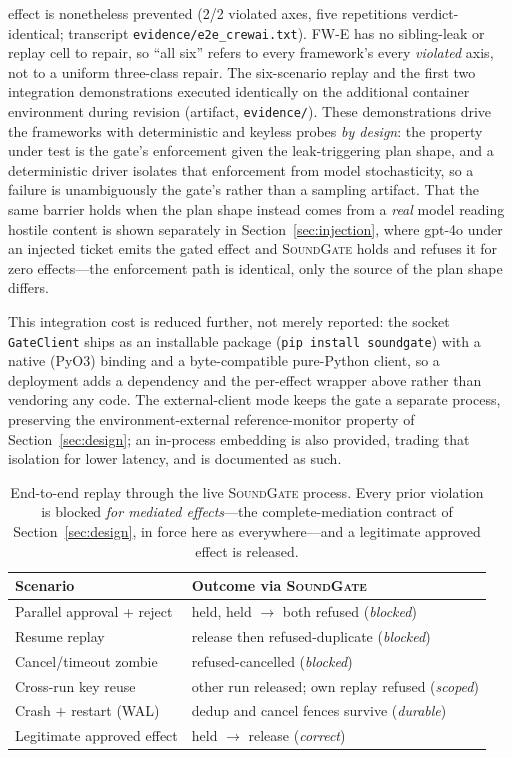 \documentclass[10pt,journal,compsoc]{IEEEtran}
\newcommand{\sys}{\textsc{SoundGate}}
\begin{document}
effect is nonetheless prevented (2/2 violated axes, five repetitions
verdict-identical; transcript \texttt{evidence/e2e\_crewai.txt}).
\textsf{FW-E} has no sibling-leak or
replay cell to repair, so ``all six'' refers to every framework's every
\emph{violated} axis, not to a uniform three-class repair. The six-scenario replay and the first two
integration demonstrations executed identically on the additional container
environment during revision (artifact, \texttt{evidence/}). These
demonstrations drive the frameworks with deterministic and keyless probes
\emph{by design}: the property under test is the gate's enforcement given the
leak-triggering plan shape, and a deterministic driver isolates that
enforcement from model stochasticity, so a failure is unambiguously the
gate's rather than a sampling artifact. That the same barrier holds when the
plan shape instead comes from a \emph{real} model reading hostile content is
shown separately in Section~\ref{sec:injection}, where \textsf{gpt-4o} under
an injected ticket emits the gated effect and \sys{} holds and refuses it for
zero effects---the enforcement path is identical, only the source of the plan
shape differs.

\noindent This integration cost is reduced further, not merely reported: the
socket \texttt{GateClient} ships as an installable package
(\texttt{pip install soundgate}) with a native (PyO3) binding and a
byte-compatible pure-Python client, so a deployment adds a dependency and the
per-effect wrapper above rather than vendoring any code. The external-client
mode keeps the gate a separate process, preserving the environment-external
reference-monitor property of Section~\ref{sec:design}; an in-process embedding
is also provided, trading that isolation for lower latency, and is documented as
such.

\begin{table}[!t]
\centering
\caption{End-to-end replay through the live \sys{} process. Every prior
violation is blocked \emph{for mediated effects}---the complete-mediation
contract of Section~\ref{sec:design}, in force here as everywhere---and a
legitimate approved effect is released.}
\label{tab:e2e}
\renewcommand{\arraystretch}{1.25}
\begin{tabularx}{\columnwidth}{@{}Xl@{}}
\toprule
\textbf{Scenario} & \textbf{Outcome via \sys{}}\\
\midrule
Parallel approval + reject       & held, held $\rightarrow$ both refused (\emph{blocked})\\
Resume replay                    & release then refused-duplicate (\emph{blocked})\\
Cancel/timeout zombie            & refused-cancelled (\emph{blocked})\\
Cross-run key reuse              & other run released; own replay refused (\emph{scoped})\\
Crash $+$ restart (WAL)          & dedup and cancel fences survive (\emph{durable})\\
Legitimate approved effect       & held $\rightarrow$ release (\emph{correct})\\
\bottomrule
\end{tabularx}
\end{table}
\end{document}
